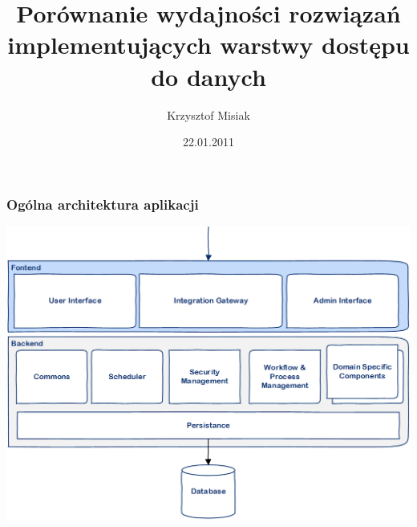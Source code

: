 \documentclass{beamer}
\title[Porównanie wydajności implementacji warstwy danych]{Porównanie wydajności rozwiązań implementujących warstwy dostępu do danych}
\author[K. Misiak]{Krzysztof Misiak}
\date[2017]{22.01.2011}
\institute[AGH-UST]
{Faculty of EEACSE\\ 
Department of Automatics
}
\begin{document}
{
 \begin{frame}
   \titlepage
 \end{frame}
}



\begin{frame}
\frametitle{Ogólna architektura aplikacji}
\begin{center}
\includegraphics[height=.6\textheight,keepaspectratio]{architecture.png}
\end{center}
\end{frame}
\end{document}
